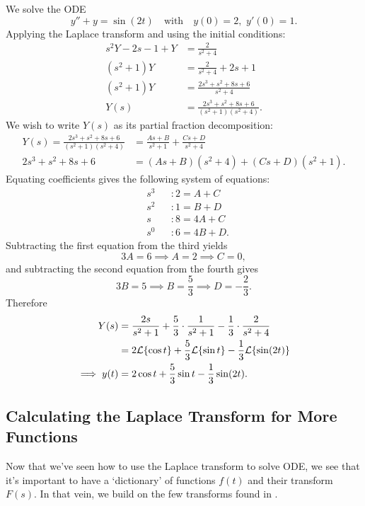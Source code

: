 \begin{eg}
	We solve the ODE
	\[
	y''+y = \sin(2t) \quad\text{with}\quad y(0)=2, \,\,y'(0)=1.
	\]
	Applying the Laplace transform and using the initial conditions:
	\begin{align*}
		s^2Y - 2s - 1 + Y &= \frac{2}{s^2+4} \\
		(s^2+1)Y &= \frac{2}{s^2+4} +2s+1 \\
		(s^2+1)Y &= \frac{2s^3+s^2+8s+6}{s^2+4} \\
		Y(s) &= \frac{2s^3+s^2+8s+6}{(s^2+1)(s^2+4)}.
	\end{align*}
	We wish to write $Y(s)$ as its partial fraction decomposition:
	\begin{align*}
		Y(s) = \frac{2s^3+s^2+8s+6}{(s^2+1)(s^2+4)} &= \frac{As+B}{s^2+1} + \frac{Cs+D}{s^2+4} \\
		2s^3+s^2+8s+6 &= (As+B)(s^2+4) + (Cs+D)(s^2+1).
	\end{align*}
	Equating coefficients gives the following system of equations:
	\begin{equation*}
		\begin{alignedat}{2}
			&s^3 &&: 2 = A+C \\
			&s^2 &&: 1 = B+D \\
			&s &&: 8 = 4A+C \\
			&s^0 &&: 6 = 4B+D.
		\end{alignedat}
	\end{equation*}
	Subtracting the first equation from the third yields
	\[
	3A = 6 \implies A = 2 \implies C=0,
	\]
	and subtracting the second equation from the fourth gives
	\[
	3B = 5 \implies B = \frac53 \implies D = -\frac23.
	\]
	Therefore
	\begin{align*}
		Y(s) &= \frac{2s}{s^2+1} + \frac53\cdot\frac{1}{s^2+1} - \frac13\cdot\frac{2}{s^2+4} \\
		&= 2\mathcal{L}\{\cos{t}\} + \frac53\mathcal{L}\{\sin{t}\} - \frac13\mathcal{L}\{\sin(2t)\} \\
		\implies y(t) &= 2\cos{t} + \frac53\sin{t} - \frac13\sin(2t).
	\end{align*}
\end{eg}

\subsection{Calculating the Laplace Transform for More Functions}

Now that we've seen how to use the Laplace transform to solve ODE, we see that it's important to have a `dictionary' of functions $f(t)$ and their transform $F(s)$. In that vein, we build on the few transforms found in .


